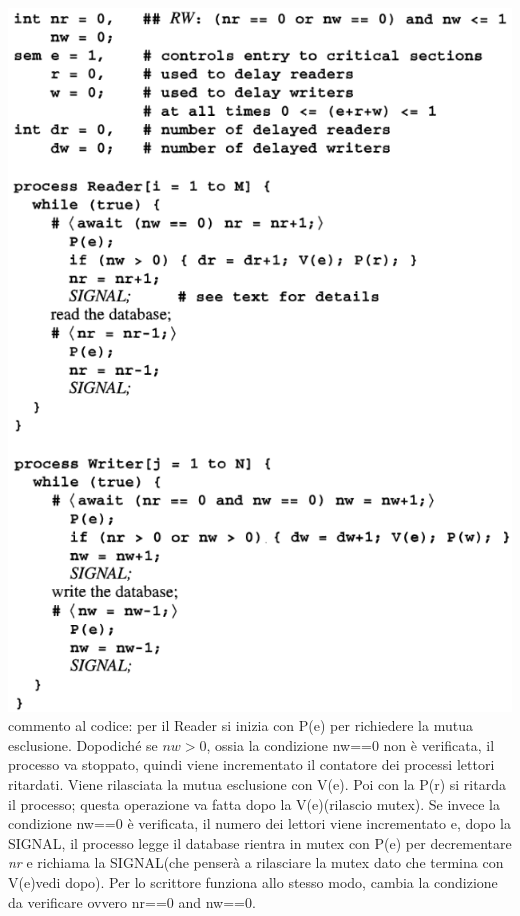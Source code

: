 \documentclass[10pt,a4paper]{book}
\begin{document}
\includegraphics[scale=0.41]{img/baton5.png} \\
commento al codice: per il Reader si inizia con P(e) per richiedere la mutua esclusione. Dopodiché se $ nw>0 $, ossia la condizione nw==0 non è verificata, il processo va stoppato, quindi viene incrementato il contatore dei processi lettori ritardati. Viene rilasciata la mutua esclusione con V(e). Poi con la P(r) si ritarda il processo; questa operazione va fatta dopo la V(e)(rilascio mutex).
Se invece la condizione nw==0 è verificata, il numero dei lettori viene incrementato e, dopo la SIGNAL, il processo legge il database rientra in mutex con P(e) per decrementare \textit{nr} e richiama la SIGNAL(che penserà a rilasciare la mutex dato che termina con V(e)vedi dopo).
Per lo scrittore funziona allo stesso modo, cambia la condizione da verificare ovvero nr==0 and nw==0.\\ 
\end{document}
